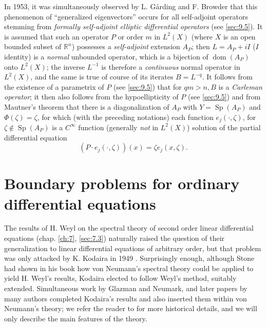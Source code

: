 \documentclass[12pt,a4paper,leqno,twoside]{extbook}
\newcommand{\R}{\mathbb{R}}
\newcommand{\dom}{\operatorname{dom}}
\newcommand{\spec}{\operatorname{Sp}}
\begin{document}
In 1953, it was simultaneously observed by L. Gårding \cite{081} and F. Browder \cite{034} that this phenomenon of ``generalized eigenvectors'' occurs for all self-adjoint operators stemming from \emph{formally self-adjoint elliptic differential operators} (see \ref{sec:9.5}). It is assumed that such an operator \(P\) or order \(m\) in \(L^2(X)\) (where \(X\) is an open bounded subset of \(\R^n\)) possesses a \emph{self-adjoint} extension \(A_P\); then \(L = A_P + iI\) (\(I\) identity) is a \emph{normal} unbounded operator, which is a bijection of \(\dom(A_P)\) onto \(L^2(X)\); the inverse \(L^{-1}\) is therefore a \emph{continuous} normal operator in \(L^2(X)\), and the same is true of course of its iterates \(B = L^{-q}\). It follows from the existence of a parametrix of \(P\) (see \ref{sec:9.5}) that for \(qm > n, B\) is a \emph{Carleman operator}; it then also follows from the hypoellipticity of \(P\) (see \ref{sec:9.5}) and from Mautner's theorem that there is a diagonalization of \(A_P\) with \(Y = \spec(A_P)\) and \(\Phi(\zeta) = \zeta\), for which (with the preceding notations) each function \(e_j(\cdot, \zeta)\), for \(\zeta \not\in \spec(A_P)\) is a \(C^\infty\) function (generally \emph{not} in \(L^2(X)\)) solution of the partial differential equation
\begin{equation}
    \label{eq:9.14}
    (P \cdot e_j(\cdot, \zeta))(x) = \zeta e_j(x, \zeta).
\end{equation}

\section{Boundary problems for ordinary differential equations}
\label{sec:9.3}

The results of H. Weyl on the spectral theory of second order linear differential equations (chap. \ref{ch:7}, \ref{sec:7.3}) naturally raised the question of their generalization to linear differential equations of arbitrary order, but that problem was only attacked by K. Kodaira in 1949 \cite{126}. Surprisingly enough, although Stone had shown in his book \cite{207} how von Neumann's spectral theory could be applied to yield H. Weyl's results, Kodaira elected to follow Weyl's method, suitably extended. Simultaneous work by Glazman and Neumark, and later papers by many authors completed Kodaira's results and also inserted them within von Neumann's theory; we refer the reader to \cite[vol.~II, p.~1588--1592]{062} for more historical details, and we will only describe the main features of the theory.
\end{document}
